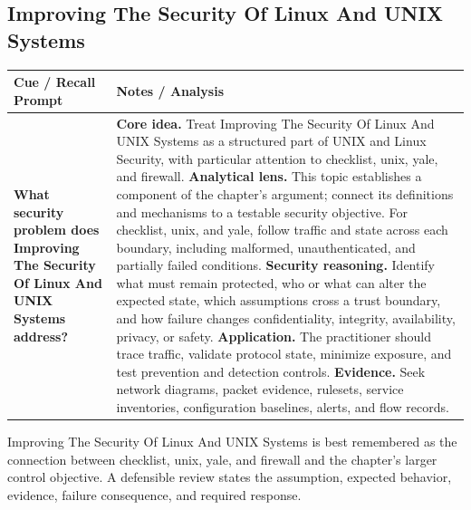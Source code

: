 \documentclass[11pt]{article}
\newcommand{\CornellHeader}{%
\rowcolor{Navy}\color{white}\bfseries Cue / Recall Prompt & \color{white}\bfseries Notes / Analysis\\\hline}
\newcommand{\CornellRow}[2]{%
\cellcolor{CueGray}\RaggedRight\textbf{#1} & \RaggedRight #2\\\hline}
\begin{document}
\subsection*{Improving The Security Of Linux And UNIX Systems}
\begin{longtable}{>{\RaggedRight\arraybackslash}p{}|>{\RaggedRight\arraybackslash}p{}}
\CornellHeader
\CornellRow{What security problem does Improving The Security Of Linux And UNIX Systems address?}{\textbf{Core idea.} Treat Improving The Security Of Linux And UNIX Systems as a structured part of UNIX and Linux Security, with particular attention to checklist, unix, yale, and firewall. \textbf{Analytical lens.} This topic establishes a component of the chapter's argument; connect its definitions and mechanisms to a testable security objective. For checklist, unix, and yale, follow traffic and state across each boundary, including malformed, unauthenticated, and partially failed conditions. \textbf{Security reasoning.} Identify what must remain protected, who or what can alter the expected state, which assumptions cross a trust boundary, and how failure changes confidentiality, integrity, availability, privacy, or safety. \textbf{Application.} The practitioner should trace traffic, validate protocol state, minimize exposure, and test prevention and detection controls. \textbf{Evidence.} Seek network diagrams, packet evidence, rulesets, service inventories, configuration baselines, alerts, and flow records.}
\end{longtable}
\begin{topicsummary}
Improving The Security Of Linux And UNIX Systems is best remembered as the connection between checklist, unix, yale, and firewall and the chapter's larger control objective. A defensible review states the assumption, expected behavior, evidence, failure consequence, and required response.
\end{topicsummary}
\end{document}
